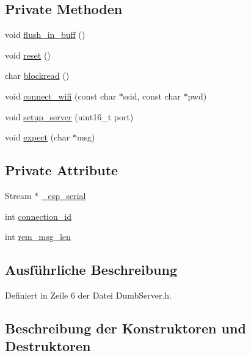 \subsection*{Private Methoden}
\begin{DoxyCompactItemize}
\item 
void \hyperlink{class_esp_server_a1d791edc8eca304acc71f702f07c0437}{flush\+\_\+in\+\_\+buff} ()
\item 
void \hyperlink{class_esp_server_ad20897c5c8bd47f5d4005989bead0e55}{reset} ()
\item 
char \hyperlink{class_esp_server_ac2b4ae3c7ebcd751c4c8020412fa3270}{blockread} ()
\item 
void \hyperlink{class_esp_server_a504393c8aa6394b2d0631146425bf011}{connect\+\_\+wifi} (const char $\ast$ssid, const char $\ast$pwd)
\item 
void \hyperlink{class_esp_server_a7968cc44a6c9fff24b9020e1714c49f8}{setup\+\_\+server} (uint16\+\_\+t port)
\item 
void \hyperlink{class_esp_server_aff5ea67ab96af075223b2b836036ccf1}{expect} (char $\ast$msg)
\end{DoxyCompactItemize}
\subsection*{Private Attribute}
\begin{DoxyCompactItemize}
\item 
Stream $\ast$ \hyperlink{class_esp_server_a552aab874ad99b696f4c997d6f5a4746}{\+\_\+esp\+\_\+serial}
\item 
int \hyperlink{class_esp_server_a821bd4e05f0b260cc584a2d23bda0fff}{connection\+\_\+id}
\item 
int \hyperlink{class_esp_server_a34a62d83c82a13f441af983f9b212e25}{rem\+\_\+msg\+\_\+len}
\end{DoxyCompactItemize}


\subsection{Ausführliche Beschreibung}


Definiert in Zeile 6 der Datei Dumb\+Server.\+h.



\subsection{Beschreibung der Konstruktoren und Destruktoren}
\mbox{\label{class_esp_server_aa852bdd3db81410e2b71cafa8adb5c79}} 
